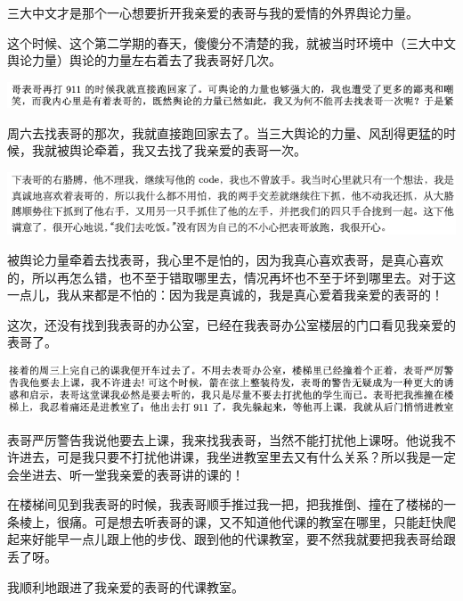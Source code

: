 \documentclass[9pt, b5paper]{article}
\begin{document}
三大中文才是那个一心想要折开我亲爱的表哥与我的爱情的外界舆论力量。

这个时候、这个第二学期的春天，傻傻分不清楚的我，就被当时环境中（三大中文舆论力量）舆论的力量左右着去了我表哥好几次。 

\begin{center}
\includegraphics[width=.9\linewidth]{./pic/backups_plans_20210505_205705.png}
\end{center}

周六去找表哥的那次，我就直接跑回家去了。当三大舆论的力量、风刮得更猛的时候，我就被舆论牵着，我又去找了我亲爱的表哥一次。 

\begin{center}
\includegraphics[width=.9\linewidth]{./pic/backups_plans_20210505_210307.png}
\end{center}

被舆论力量牵着去找表哥，我心里不是怕的，因为我真心喜欢表哥，是真心喜欢的，所以再怎么错，也不至于错取哪里去，情况再坏也不至于坏到哪里去。对于这一点儿，我从来都是不怕的：因为我是真诚的，我是真心爱着我亲爱的表哥的！

这次，还没有找到我表哥的办公室，已经在我表哥办公室楼层的门口看见我亲爱的表哥了。

\begin{center}
\includegraphics[width=.9\linewidth]{./pic/backups_plans_20210505_210552.png}
\end{center}

表哥严厉警告我说他要去上课，我来找我表哥，当然不能打扰他上课呀。他说我不许进去，可是我只要不打扰他讲课，我坐进教室里去又有什么关系？所以我是一定会坐进去、听一堂我亲爱的表哥讲的课的！

在楼梯间见到我表哥的时候，我表哥顺手推过我一把，把我推倒、撞在了楼梯的一条棱上，很痛。可是想去听表哥的课，又不知道他代课的教室在哪里，只能赶快爬起来好能早一点儿跟上他的步伐、跟到他的代课教室，要不然我就要把我表哥给跟丢了呀。

我顺利地跟进了我亲爱的表哥的代课教室。
\end{document}
